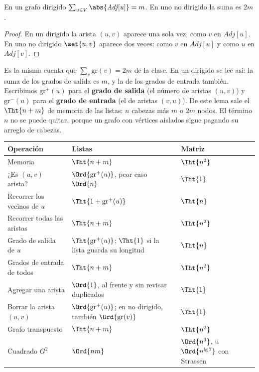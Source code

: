 \documentclass[11pt,letterpaper]{article}
\begin{document}
\begin{lema}
  \label{lem:busq-longitud-listas}
  En un grafo dirigido $\sum_{u \in V} \abs{\mathit{Adj}[u]} = m$. En
  uno no dirigido la suma es $2m$.
\end{lema}

\begin{proof}
  En un dirigido la arista $(u, v)$ aparece una sola vez, como $v$ en
  $\mathit{Adj}[u]$. En uno no dirigido $\set{u, v}$ aparece dos
  veces: como $v$ en $\mathit{Adj}[u]$ y como $u$ en $\mathit{Adj}[v]$.
\end{proof}

Es la misma cuenta que $\sum_v \text{gr}(v) = 2m$ de la clase. En un
dirigido se lee así: la suma de los grados de salida es $m$, y la de
los grados de entrada también. Escribimos $\text{gr}^{+}(u)$ para el
\textbf{grado de salida} (el número de aristas $(u, v)$) y
$\text{gr}^{-}(u)$ para el \textbf{grado de entrada} (el de aristas
$(v, u)$). De este lema sale el $\Tht{n + m}$ de memoria de las
listas: $n$ cabezas más $m$ o $2m$ nodos. El término $n$ no se puede
quitar, porque un grafo con vértices aislados sigue pagando su
arreglo de cabezas.

\begin{center}
\small
\begin{tabular}{l>{\raggedright\arraybackslash}p{6.1cm}%
                >{\raggedright\arraybackslash}p{3.6cm}}
  \toprule
  \textbf{Operación} & \textbf{Listas} & \textbf{Matriz} \\
  \midrule
  Memoria & $\Tht{n + m}$ & $\Tht{n^2}$ \\
  ¿Es $(u, v)$ arista? & $\Ord{\text{gr}^{+}(u)}$, peor caso
    $\Ord{n}$ & $\Tht{1}$ \\
  Recorrer los vecinos de $u$ & $\Tht{1 + \text{gr}^{+}(u)}$
    & $\Tht{n}$ \\
  Recorrer todas las aristas & $\Tht{n + m}$ & $\Tht{n^2}$ \\
  Grado de salida de $u$ & $\Tht{\text{gr}^{+}(u)}$; $\Tht{1}$ si la
    lista guarda su longitud & $\Tht{n}$ \\
  Grados de entrada de todos & $\Tht{n + m}$ & $\Tht{n^2}$ \\
  Agregar una arista & $\Ord{1}$, al frente y sin revisar duplicados
    & $\Tht{1}$ \\
  Borrar la arista $(u, v)$ & $\Ord{\text{gr}^{+}(u)}$; en no
    dirigido, también $\Ord{\text{gr}(v)}$ & $\Tht{1}$ \\
  Grafo transpuesto & $\Tht{n + m}$ & $\Tht{n^2}$ \\
  Cuadrado $G^2$ & $\Ord{nm}$ & $\Ord{n^3}$, u
    $\Ord{n^{\lg 7}}$ con Strassen \\
  \bottomrule
\end{tabular}
\end{center}
\end{document}
